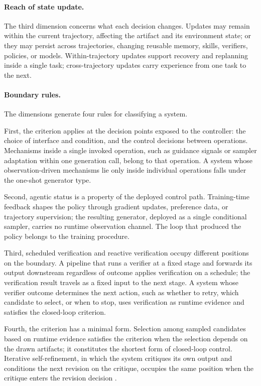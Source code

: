 \paragraph{Reach of state update.}
The third dimension concerns what each decision changes. Updates may remain within the current trajectory, affecting the artifact and its environment state; or they may persist across trajectories, changing reusable memory, skills, verifiers, policies, or models. Within-trajectory updates support recovery and replanning inside a single task; cross-trajectory updates carry experience from one task to the next.

\paragraph{Boundary rules.}
The dimensions generate four rules for classifying a system.

First, the criterion applies at the decision points exposed to the controller: the choice of interface and condition, and the control decisions between operations. Mechanisms inside a single invoked operation, such as guidance signals or sampler adaptation within one generation call, belong to that operation. A system whose observation-driven mechanisms lie only inside individual operations falls under the one-shot generator type.

Second, agentic status is a property of the deployed control path. Training-time feedback shapes the policy through gradient updates, preference data, or trajectory supervision; the resulting generator, deployed as a single conditional sampler, carries no runtime observation channel. The loop that produced the policy belongs to the training procedure.

Third, scheduled verification and reactive verification occupy different positions on the boundary. A pipeline that runs a verifier at a fixed stage and forwards its output downstream regardless of outcome applies verification on a schedule; the verification result travels as a fixed input to the next stage. A system whose verifier outcome determines the next action, such as whether to retry, which candidate to select, or when to stop, uses verification as runtime evidence and satisfies the closed-loop criterion.

Fourth, the criterion has a minimal form. Selection among sampled candidates based on runtime evidence satisfies the criterion when the selection depends on the drawn artifacts; it constitutes the shortest form of closed-loop control. Iterative self-refinement, in which the system critiques its own output and conditions the next revision on the critique, occupies the same position when the critique enters the revision decision \cite{madaan2023selfrefine,shinn2023reflexion}.

